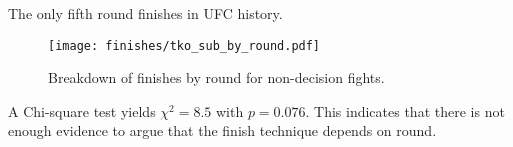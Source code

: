 \begin{center}
\begin{table}[h]

\caption{The only fifth round finishes in UFC history.}
\label{latest_finishes}
\end{table}
\end{center}

\begin{figure}[h]
\begin{center}
\texttt{[image: finishes/tko\_sub\_by\_round.pdf]}
\caption{Breakdown of finishes by round for non-decision fights.}
\label{height_reach_all_fighters}
\end{center}
\end{figure}

A Chi-square test yields $\chi^2=8.5$ with $p=0.076$. This indicates
that there is not enough evidence to argue that the finish technique
depends on round.

